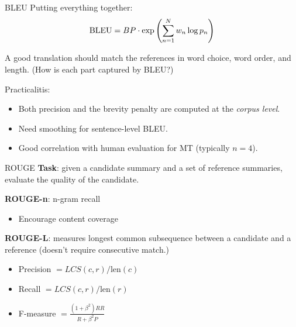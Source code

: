 \documentclass[usenames,dvipsnames,notes,11pt,aspectratio=169,hyperref={colorlinks=true, linkcolor=blue}]{beamer}
\begin{document}
\begin{frame}
    {BLEU}
    Putting everything together:
    \begin{align*}
        \text{BLEU} &= BP\cdot \exp\left( \sum_{n=1}^N w_n \log p_n \right) \\
    \end{align*}
    \vspace{-2em}

    \pause
    A good translation should match the references in word choice, word order, and length. (How is each part captured by BLEU?)

    \pause
    Practicalitis:\\
    \begin{itemize}
        \item Both precision and the brevity penalty are computed at the \emph{corpus level}.
        \item Need smoothing for sentence-level BLEU.
        \item Good correlation with human evaluation for MT (typically $n=4$).
    \end{itemize}
\end{frame}

\begin{frame}
    {ROUGE}
    \textbf{Task}: given a candidate summary and a set of reference summaries, evaluate the quality of the candidate.

    \textbf{ROUGE-n}: n-gram recall\\
    \begin{itemize}
        \item Encourage content coverage 
    \end{itemize}

    \textbf{ROUGE-L}: measures longest common subsequence between a candidate and a reference (doesn't require consecutive match.)\\
    \begin{itemize}
        \item Precision $ = LCS(c, r) / \text{len}(c)$
        \item Recall $ = LCS(c, r) / \text{len}(r)$
        \item F-measure $ = \frac{(1+\beta^2)RR}{R + \beta^2 P}$
    \end{itemize}
\end{frame}
\end{document}
